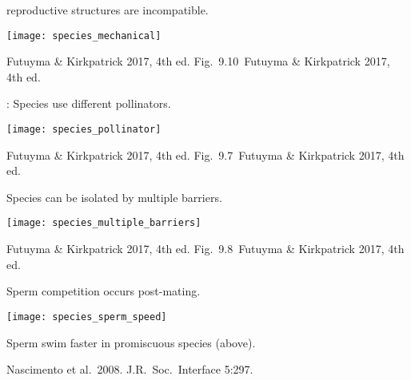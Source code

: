 \documentclass[t]{beamer}
\newcommand{\futuyma}[1]{%
	\ifthenelse{\isempty{#1}}%
	{Futuyma \& Kirkpatrick 2017, 4th ed.}%
	{Fig.~#1~Futuyma \& Kirkpatrick 2017, 4th ed.}%
}
\newcommand{\backskip}{\vspace{-0.5\baselineskip}}
\begin{document}

\begin{frame}{ reproductive structures are incompatible.}

\backskip

\centering

\texttt{[image: species\_mechanical]}

\vfilll

\tiny {} \hfill \futuyma{9.10}
\end{frame}


\begin{frame}{: Species use different pollinators.}

\backskip

\centering

\texttt{[image: species\_pollinator]}

\vfilll

\tiny {} \hfill \futuyma{9.7}

\end{frame}


\begin{frame}{Species can be isolated by multiple barriers.}

\backskip

\centering

\texttt{[image: species\_multiple\_barriers]}

\vfilll

\tiny {} \hfill \futuyma{9.8}

\end{frame}


\begin{frame}{Sperm competition occurs post-mating.}

\backskip

\begin{multicols}{2}

{\centering
\noindent\texttt{[image: species\_sperm\_speed]}
}


\hangpara Sperm swim faster in promiscuous species (above).

\columnbreak

\end{multicols}

\vfilll

\tiny {}\quad Nascimento et al.~2008. J.R.~Soc.~Interface 5:297. 

\end{frame}
\end{document}
